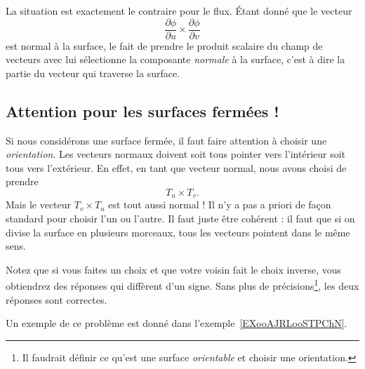 La situation est exactement le contraire pour le flux. Étant donné que le vecteur
\begin{equation}
    \frac{ \partial \phi }{ \partial u }\times\frac{ \partial \phi }{ \partial v }
\end{equation}
est normal à la surface, le fait de prendre le produit scalaire du champ de vecteurs avec lui sélectionne la composante \emph{normale} à la surface, c'est à dire la partie du vecteur qui traverse la surface.

\subsection{Attention pour les surfaces fermées !}

Si nous considérons une surface fermée, il faut faire attention à choisir une \emph{orientation}. Les vecteurs normaux doivent soit tous pointer vers l'intérieur soit tous vers l'extérieur. En effet, en tant que vecteur normal, nous avons choisi de prendre
\begin{equation}
    T_u\times T_v.
\end{equation}
Mais le vecteur $T_v\times T_u$ est tout aussi normal ! Il n'y a pas a priori de façon standard pour choisir l'un ou l'autre. Il faut juste être cohérent : il faut que si on divise la surface en plusieurs morceaux, tous les vecteurs pointent dans le même sens.

Notez que si vous faites un choix et que votre voisin fait le choix inverse, vous obtiendrez des réponses qui diffèrent d'un signe. Sans plus de précisions\footnote{Il faudrait définir ce qu'est une surface \emph{orientable} et choisir une orientation.}, les deux réponses sont correctes.

Un exemple de ce problème est donné dans l'exemple~\ref{EXooAJRLooSTPChN}.

